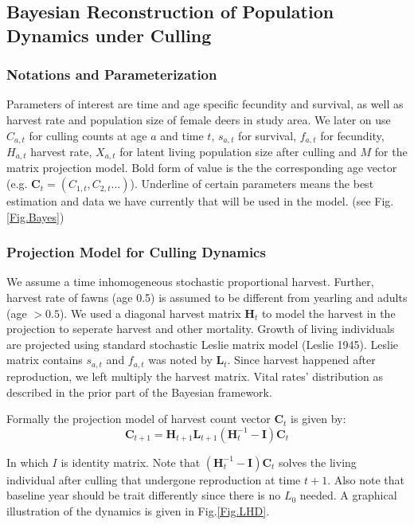 \documentclass[]{article}
\begin{document}
\subsection{Bayesian Reconstruction of Population Dynamics under Culling}
\subsubsection{Notations and Parameterization}
Parameters of interest are time and age specific fecundity and survival, as well as harvest rate and population size of female deers in study area. We later on use $C_{a,t}$ for culling counts at age $a$ and time $t$, $s_{a,t}$ for survival, $f_{a,t}$ for fecundity, $H_{a,t}$ harvest rate, $X_{a,t}$ for latent living population size after culling and $M$ for the matrix projection model. Bold form of value is the the corresponding age vector (e.g. $\mathbf{C}_{t}=(C_{1,t},C_{2,t}...)$). Underline of certain parameters means the best estimation and data we have currently that will be used in the model. (see Fig.\ref{Fig.Bayes}) 

\subsubsection{Projection Model for Culling Dynamics}
We assume a time inhomogeneous stochastic proportional harvest. Further, harvest rate of fawns (age 0.5) is assumed to be different from yearling and adults (age $>0.5$). We used a diagonal harvest matrix $\mathbf{H}_{t}$ to model the harvest in the projection to seperate harvest and other mortality. Growth of living individuals are projected using standard stochastic Leslie matrix model (Leslie 1945). Leslie matrix contains $s_{a,t}$ and $f_{a,t}$ was noted by $\mathbf{L}_{t}$. Since harvest happened after reproduction, we left multiply the harvest matrix. Vital rates' distribution as described in the prior part of the Bayesian framework.

Formally the projection model of harvest count vector $\mathbf{C}_{t}$ is given by:
\begin{equation}
\label{proj}
\mathbf{C}_{t+1}=\mathbf{H}_{t+1}\mathbf{L}_{t+1}(\mathbf{H}_{t}^{-1}-\mathbf{I})\mathbf{C}_{t}
\end{equation}  

In which $I$ is identity matrix. Note that $(\mathbf{H}_{t}^{-1}-\mathbf{I})\mathbf{C}_{t}$ solves the living individual after culling that undergone reproduction at time $t+1$. Also note that baseline year should be trait differently since there is no $L_{0}$ needed. A graphical illustration of the dynamics is given in Fig.\ref{Fig.LHD}.
\end{document}
